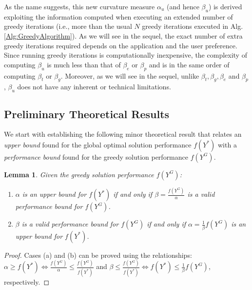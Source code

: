 \documentclass[conference]{IEEEtran}
\newtheorem{lemma}{Lemma}
\begin{document}
As the name suggests, this new curvature measure $\alpha_u$ (and hence $\beta_u$) is derived exploiting the information computed when executing an extended number of greedy iterations (i.e., more than the usual $N$ greedy iterations executed in Alg. \ref{Alg:GreedyAlgorithm}). As we will see in the sequel, the exact number of extra greedy iterations required depends on the application and the user preference. Since running greedy iterations is computationally inexpensive, the complexity of computing $\beta_u$ is much less than that of $\beta_e$ or $\beta_p$ and is in the same order of computing $\beta_t$ or $\beta_g$. Moreover, as we will see in the sequel, unlike  $\beta_t,\beta_g,\beta_e$ and $\beta_p$, $\beta_u$ does not have any inherent or technical limitations. 





\subsection{Preliminary Theoretical Results}
We start with establishing the following minor theoretical result that relates an \emph{upper bound} found for the global optimal solution performance $f(Y^*)$ with a \emph{performance bound} found for the greedy solution performance $f(Y^G)$.

\begin{lemma}\label{Lm:UpperBoundVsPerformanceBound}
Given the greedy solution performance $f(Y^G)$: 
\begin{enumerate}[label=(\alph*)]
    \item $\alpha$ is an upper bound for $f(Y^*)$ if and only if 
    $\beta = \frac{f(Y^G)}{\alpha}$ is a valid performance bound for $f(Y^G)$.
    \item $\beta$ is a valid performance bound for $f(Y^G)$ if and only if $\alpha = \frac{1}{\beta}f(Y^G)$ is an upper bound for $f(Y^*)$.
\end{enumerate} 
\end{lemma}
\begin{proof}
Cases (a) and (b) can be proved using the relationships: $\alpha \geq f(Y^*) \iff \frac{f(Y^G)}{\alpha} \leq \frac{f(Y^G)}{f(Y^*)}$ and $\beta \leq \frac{f(Y^G)}{f(Y^*)} \iff f(Y^*) \leq \frac{1}{\beta}f(Y^G)$, respectively.
\end{proof}
\end{document}
